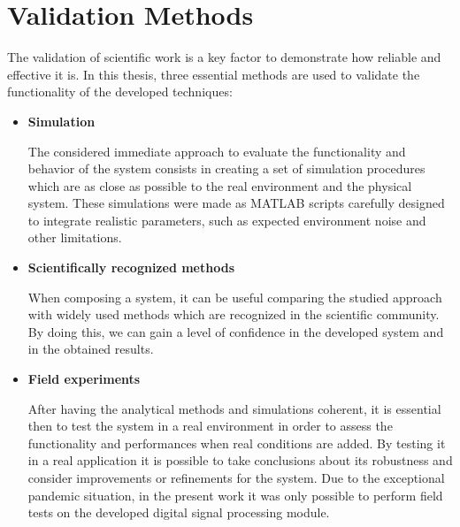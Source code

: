\section{Validation Methods} \label{sec:validation}

The validation of scientific work is a key factor to demonstrate how reliable and effective it is. In this thesis, three essential methods are used to validate the functionality of the developed techniques:

\begin{itemize}
	
	\item \textbf{Simulation}
	
	The considered immediate approach to evaluate the functionality and behavior of the system consists in creating a set of simulation procedures which are as close as possible to the real environment and the physical system. These simulations were made as MATLAB scripts carefully designed to integrate realistic parameters, such as expected environment noise and other limitations.
	
	\item \textbf{Scientifically recognized methods}
	
	When composing a system, it can be useful comparing the studied approach with widely used methods which are recognized in the scientific community. By doing this, we can gain a level of confidence in the developed system and in the obtained results.
	
	\item \textbf{Field experiments}
	
	After having the analytical methods and simulations coherent, it is essential then to test the system in a real environment in order to assess the functionality and performances when real conditions are added. By testing it in a real application it is possible to take conclusions about its robustness and consider improvements or refinements for the system.
	Due to the exceptional pandemic situation, in the present work it was only possible to perform field tests on the developed digital signal processing module. 

\end{itemize}
